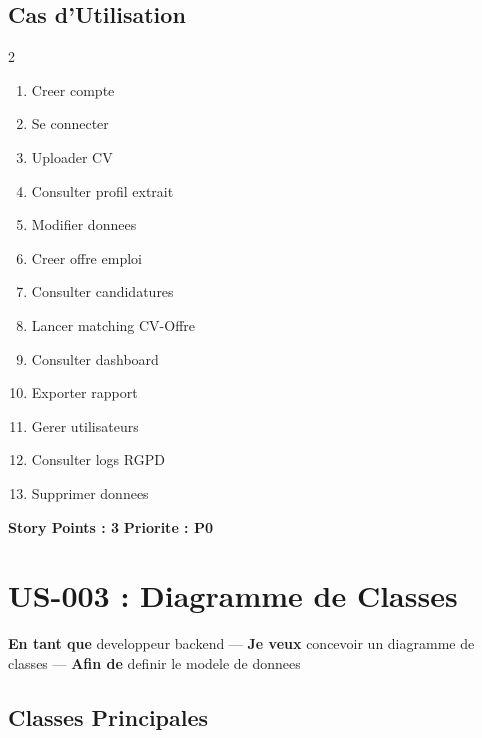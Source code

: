 ﻿\documentclass[12pt,a4paper]{report}
\begin{document}
\subsection*{Cas d'Utilisation}
\begin{multicols}{2}
\begin{enumerate}
    \item Creer compte
    \item Se connecter
    \item Uploader CV
    \item Consulter profil extrait
    \item Modifier donnees
    \item Creer offre emploi
    \item Consulter candidatures
    \item Lancer matching CV-Offre
    \item Consulter dashboard
    \item Exporter rapport
    \item Gerer utilisateurs
    \item Consulter logs RGPD
    \item Supprimer donnees
\end{enumerate}
\end{multicols}

\textbf{Story Points : 3} \hfill \textbf{Priorite : P0}

\section{US-003 : Diagramme de Classes}

\textbf{En tant que} developpeur backend ---
\textbf{Je veux} concevoir un diagramme de classes ---
\textbf{Afin de} definir le modele de donnees

\subsection*{Classes Principales}
\end{document}
